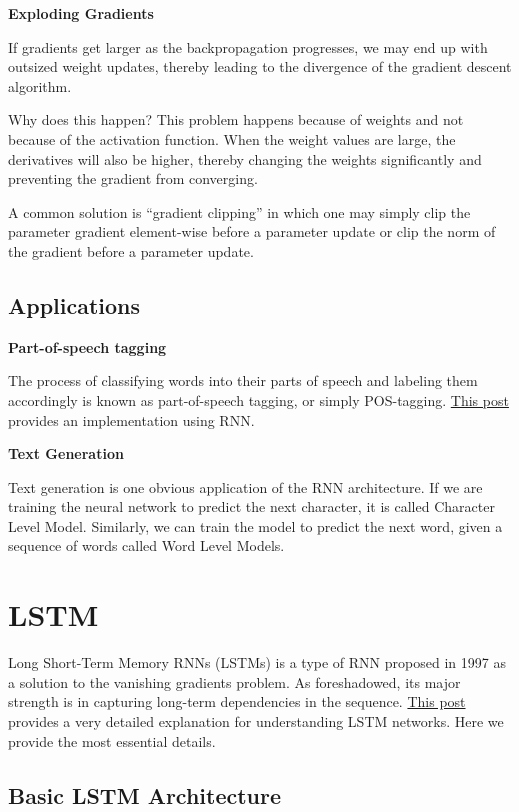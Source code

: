 \documentclass[
]{book}
\begin{document}
\textbf{Exploding Gradients}

If gradients get larger as the backpropagation progresses, we may end up with outsized weight updates, thereby leading to the divergence of the gradient descent algorithm.

Why does this happen? This problem happens because of weights and not because of the activation function. When the weight values are large, the derivatives will also be higher, thereby changing the weights significantly and preventing the gradient from converging.

A common solution is ``gradient clipping'' in which one may simply clip the parameter gradient element-wise before a parameter update or clip the norm of the gradient before a parameter update.

\hypertarget{applications}{%
\subsection{Applications}\label{applications}}

\textbf{Part-of-speech tagging}

The process of classifying words into their parts of speech and labeling them accordingly is known as part-of-speech tagging, or simply POS-tagging. \href{https://towardsdatascience.com/pos-tagging-using-rnn-7f08a522f849}{This post} provides an implementation using RNN.

\textbf{Text Generation}

Text generation is one obvious application of the RNN architecture. If we are training the neural network to predict the next character, it is called Character Level Model. Similarly, we can train the model to predict the next word, given a sequence of words called Word Level Models.

\hypertarget{lstm}{%
\section{LSTM}\label{lstm}}

Long Short-Term Memory RNNs (LSTMs) is a type of RNN proposed in 1997 as a solution to the vanishing gradients problem. As foreshadowed, its major strength is in capturing long-term dependencies in the sequence. \href{https://colah.github.io/posts/2015-08-Understanding-LSTMs/}{This post} provides a very detailed explanation for understanding LSTM networks. Here we provide the most essential details.

\hypertarget{basic-lstm-architecture}{%
\subsection{Basic LSTM Architecture}\label{basic-lstm-architecture}}
\end{document}
